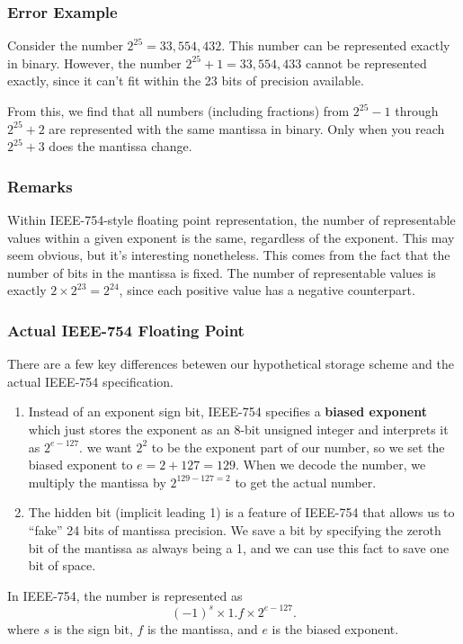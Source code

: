 \subsubsection{Error Example}

Consider the number $2^{25} = 33,554,432$. This number can be represented 
exactly in binary. However, the number $2^{25}+1 = 33,554,433$ cannot be
represented exactly, since it can't fit within the 23 bits of precision available.

From this, we find that all numbers (including fractions) from $2^{25}-1$ 
through $2^{25}+2$ are represented with the same mantissa in binary. Only when 
you reach $2^{25}+3$ does the mantissa change.

\subsubsection{Remarks}

Within IEEE-754-style floating point representation, the
number of representable values within a given exponent is the same, regardless
of the exponent. This may seem obvious, but it's interesting nonetheless. This
comes from the fact that the number of bits in the mantissa is fixed. The
number of representable values is exactly $2\times 2^{23} = 2^{24}$, since each
positive value has a negative counterpart.

\subsubsection{Actual IEEE-754 Floating Point}
There are a few key differences betewen our hypothetical storage scheme and the
actual IEEE-754 specification.

\begin{enumerate}
  \item Instead of an exponent sign bit, IEEE-754 specifies a \textbf{biased
    exponent} which just stores the exponent as an 8-bit unsigned integer and
    interprets it as $2^{e-127}$. \Ex we want $2^{2}$ to be the exponent part of
    our number, so we set the biased exponent to $e=2+127=129$. When we decode
    the number, we multiply the mantissa by $2^{129-127 = 2}$ to get the actual
    number.
  \item The hidden bit (implicit leading 1) is a feature of IEEE-754 that allows
    us to \enquote{fake} 24 bits of mantissa precision. We save a bit by
    specifying the zeroth bit of the mantissa as always being a 1, and we can
    use this fact to save one bit of space.
\end{enumerate}
In IEEE-754, the number is represented as
\[
  (-1)^{s} \times 1.f \times 2^{e-127}
.\]
where $s$ is the sign bit, $f$ is the mantissa, and $e$ is the biased exponent.
